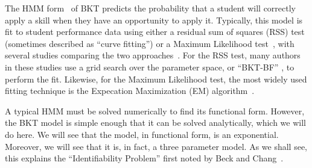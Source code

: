 \documentclass{acmlarge-edm}
\begin{document}
The HMM form~\cite{beck_identifiability:_2007} of BKT 
predicts the probability that a student will 
correctly apply a skill when they have an opportunity to apply it.
%
%
%
%
%
%
Typically, this model is fit to student performance data 
using either a residual sum of squares (RSS)
test (sometimes described as ``curve fitting'')
\cite{corbett_knowledge_1995} or a Maximum Likelihood
test~\cite{pardos_navigating_2010}, with several studies comparing the two
approaches~\cite{baker_ensembling_2011,chang_bayes_2006,pardos_ensembling_2011,pardos_sum_2012}.
For the RSS test, many authors in these studies use a grid search
over the parameter space, or ``BKT-BF'' \cite{baker_ensembling_2011}, to perform the fit.  
Likewise, for the Maximum Likelihood test, the most widely used
fitting technique is the Expecation Maximization (EM)
algorithm~\cite{dempster_maximum_1977,chang_bayes_2006}. 

A typical HMM must be solved numerically to find its functional form.
However, the BKT model is simple enough that it can be 
solved analytically, which we will do here.  We will see that the model, 
in functional form, is an exponential.  Moreover, we will see that 
it is, in fact, a three parameter model.  As we shall see, 
this explains the ``Identifiability Problem'' first noted by 
Beck and Chang~\citeyear{beck_identifiability:_2007}.
\end{document}
